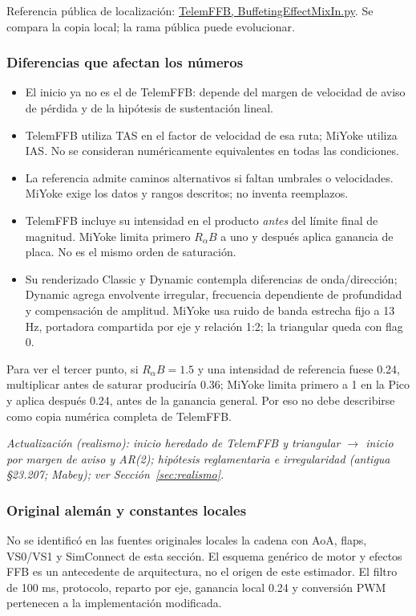 \documentclass[11pt,a4paper]{article}
\begin{document}
Referencia pública de localización: \href{https://github.com/walmis/VPforce-TelemFFB/blob/refactor/telemffb/sim/base/BuffetingEffectMixIn.py}{TelemFFB, BuffetingEffectMixIn.py}. Se compara la copia local; la rama pública puede evolucionar.

\subsubsection{Diferencias que afectan los números}
\begin{itemize}
\item El inicio ya no es el de TelemFFB: depende del margen de velocidad de aviso de pérdida y de la hipótesis de sustentación lineal.
\item TelemFFB utiliza TAS en el factor de velocidad de esa ruta; MiYoke utiliza IAS. No se consideran numéricamente equivalentes en todas las condiciones.
\item La referencia admite caminos alternativos si faltan umbrales o velocidades. MiYoke exige los datos y rangos descritos; no inventa reemplazos.
\item TelemFFB incluye su intensidad en el producto \emph{antes} del límite final de magnitud. MiYoke limita primero $R_\alpha B$ a uno y después aplica ganancia de placa. No es el mismo orden de saturación.
\item Su renderizado Classic y Dynamic contempla diferencias de onda/dirección; Dynamic agrega envolvente irregular, frecuencia dependiente de profundidad y compensación de amplitud. MiYoke usa ruido de banda estrecha fijo a 13 Hz, portadora compartida por eje y relación 1:2; la triangular queda con flag 0.
\end{itemize}
Para ver el tercer punto, si $R_\alpha B=1.5$ y una intensidad de referencia fuese 0.24, multiplicar antes de saturar produciría 0.36; MiYoke limita primero a 1 en la Pico y aplica después 0.24, antes de la ganancia general. Por eso no debe describirse como copia numérica completa de TelemFFB.

\textit{Actualización (realismo): inicio heredado de TelemFFB y triangular $\rightarrow$ inicio por margen de aviso y AR(2); hipótesis reglamentaria e irregularidad (antigua §23.207; Mabey); ver Sección~\ref{sec:realismo}.}

\subsubsection{Original alemán y constantes locales}
No se identificó en las fuentes originales locales la cadena con AoA, flaps, VS0/VS1 y SimConnect de esta sección. El esquema genérico de motor y efectos FFB es un antecedente de arquitectura, no el origen de este estimador. El filtro de 100 ms, protocolo, reparto por eje, ganancia local 0.24 y conversión PWM pertenecen a la implementación modificada.
\end{document}
